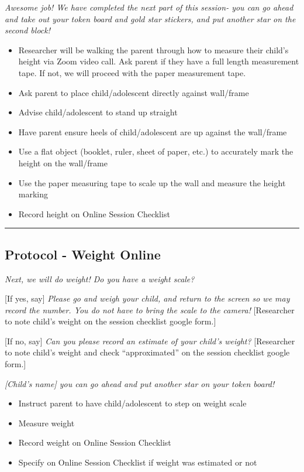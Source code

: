 \documentclass[]{book}
\providecommand{\tightlist}{%
  \setlength{\itemsep}{0pt}\setlength{\parskip}{0pt}}
\begin{document}
\emph{Awesome job! We have completed the next part of this session- you can go ahead and take out your token board and gold star stickers, and put another star on the second block!}

\begin{itemize}
\tightlist
\item
  Researcher will be walking the parent through how to measure their child's height via Zoom video call. Ask parent if they have a full length measurement tape. If not, we will proceed with the paper measurement tape.
\item
  Ask parent to place child/adolescent directly against wall/frame
\item
  Advise child/adolescent to stand up straight
\item
  Have parent ensure heels of child/adolescent are up against the wall/frame
\item
  Use a flat object (booklet, ruler, sheet of paper, etc.) to accurately mark the height on the wall/frame
\item
  Use the paper measuring tape to scale up the wall and measure the height marking
\item
  Record height on Online Session Checklist
\end{itemize}

\begin{center}\rule{0.5\linewidth}{0.5pt}\end{center}

\hypertarget{protocol---weight-online}{%
\subsection{Protocol - Weight Online}\label{protocol---weight-online}}

\emph{Next, we will do weight! Do you have a weight scale?}

{[}If yes, say{]} \emph{Please go and weigh your child, and return to the screen so we may record the number. You do not have to bring the scale to the camera!} {[}Researcher to note child's weight on the session checklist google form.{]}

{[}If no, say{]} \emph{Can you please record an estimate of your child's weight?} {[}Researcher to note child's weight and check ``approximated'' on the session checklist google form.{]}

\emph{{[}Child's name{]} you can go ahead and put another star on your token board!}

\begin{itemize}
\tightlist
\item
  Instruct parent to have child/adolescent to step on weight scale
\item
  Measure weight
\item
  Record weight on Online Session Checklist
\item
  Specify on Online Session Checklist if weight was estimated or not
\end{itemize}
\end{document}
